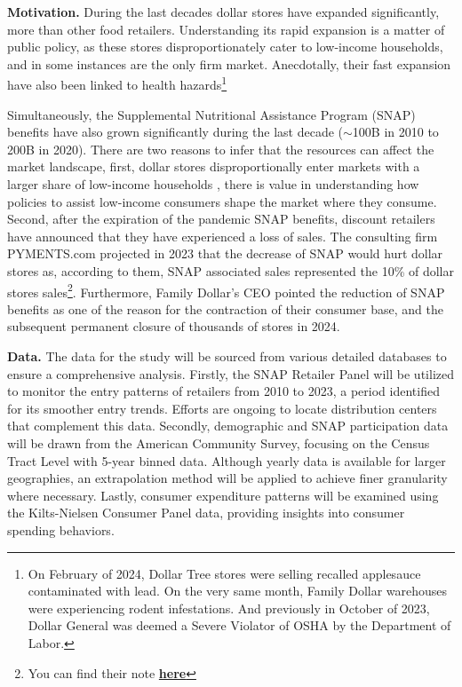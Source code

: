 \documentclass[11pt]{article}
\begin{document}
\textbf{Motivation.} During the last decades dollar stores have expanded significantly, more than other food retailers. Understanding its rapid expansion is a matter of public policy, as these stores disproportionately cater to low-income households, and in some instances are the only firm market. Anecdotally, their fast expansion have also been linked to health hazards\footnote{On February of 2024, Dollar Tree stores were selling recalled applesauce contaminated with lead. On the very same month, Family Dollar warehouses were experiencing rodent infestations. And previously in October of 2023, Dollar General was deemed a Severe Violator of OSHA by the Department of Labor.} 


Simultaneously, the Supplemental Nutritional Assistance Program (SNAP) benefits have also grown significantly during the last decade ($\sim$100B in 2010 to 200B in 2020). There are two reasons to infer that the resources can affect the market landscape, first, dollar stores disproportionally enter markets with a larger share of low-income households \cite{caoui2022impact}, there is value in understanding how policies to assist low-income consumers shape the market where they consume. Second, after the expiration of the pandemic SNAP benefits, discount retailers have announced that they have experienced a loss of sales. The consulting firm PYMENTS.com projected in 2023 that the decrease of SNAP would hurt dollar stores as, according to them, SNAP associated sales represented the 10\% of dollar stores sales\footnote{You can find their note \href{https://www.pymnts.com/economy/2023/loss-of-snap-and-grocery-inflation-push-consumers-off-hunger-cliff/}{\textbf{here}}}. Furthermore, Family Dollar's CEO pointed the reduction of SNAP benefits as one of the reason for the contraction of their consumer base, and the subsequent permanent closure of thousands of stores in 2024. 

\textbf{Data.} The data for the study will be sourced from various detailed databases to ensure a comprehensive analysis. Firstly, the SNAP Retailer Panel will be utilized to monitor the entry patterns of retailers from 2010 to 2023, a period identified for its smoother entry trends. Efforts are ongoing to locate distribution centers that complement this data. Secondly, demographic and SNAP participation data will be drawn from the American Community Survey, focusing on the Census Tract Level with 5-year binned data. Although yearly data is available for larger geographies, an extrapolation method will be applied to achieve finer granularity where necessary. Lastly, consumer expenditure patterns will be examined using the Kilts-Nielsen Consumer Panel data, providing insights into consumer spending behaviors.
\end{document}

